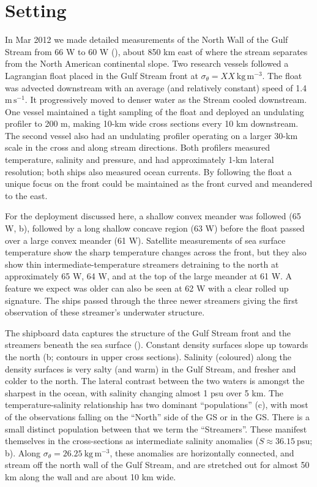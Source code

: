 \documentclass{ametsoc}
\begin{document}
\section{Setting}

In Mar 2012 we made detailed measurements of the North Wall of the Gulf Stream from 66 W to 60 W (), about 850 km east of where the stream separates from the North American continental slope.  Two research vessels followed a Lagrangian float placed in the Gulf Stream front at $\sigma_{\theta}=XX\ \mathrm{kg\,m^{-3}}$.  The float was advected downstream with an average (and relatively constant) speed of 1.4 $\mathrm{m\,s^{-1}}$. It progressively moved to denser water as the Stream cooled downstream.  One vessel maintained a tight sampling of the float and deployed an undulating profiler to 200 m, making 10-km wide cross sections every 10 km downstream.  The second vessel also had an undulating profiler operating on a larger 30-km scale in the cross and along stream directions.  Both profilers measured temperature, salinity and pressure, and had approximately 1-km lateral resolution; both ships also measured ocean currents.  By following the float a unique focus on the front could be maintained as the front curved and meandered to the east.  


For the deployment discussed here, a shallow convex meander was followed (65 W, b), followed by a long shallow concave region (63 W) before the float passed over a large convex meander (61 W).  Satellite measurements of sea surface temperature show the sharp temperature changes across the front, but they also show thin intermediate-temperature streamers detraining to the north at approximately 65 W, 64 W, and at the top of the large meander at 61 W.  A feature we expect was older can also be seen at 62 W with a clear rolled up signature.  The ships passed through the three newer streamers giving the first observation of these streamer's underwater structure.  

The shipboard data captures the structure of the Gulf Stream front and the streamers beneath the sea surface ().  Constant density surfaces slope up towards the north (b; contours in upper cross sections).  Salinity (coloured) along the density surfaces is very salty (and warm) in the Gulf Stream, and fresher and colder to the north.  The lateral contrast between the two waters is amongst the sharpest in the ocean, with salinity changing almost 1 psu over 5 km.  The temperature-salinity relationship has two dominant ``populations'' (c), with most of the observations falling on the ``North'' side of the GS or in the GS.  There is a small distinct population between that we term the ``Streamers''.  These manifest themselves in the cross-sections as intermediate salinity anomalies ($S \approx 36.15\ \mathrm{psu}$; b).   Along $\sigma_{\theta}=26.25\ \mathrm{kg\,m^{-3}}$, these anomalies are horizontally connected, and stream off the north wall of the Gulf Stream, and are stretched out for almost 50 km along the wall and are  about 10 km wide.  
\end{document}
